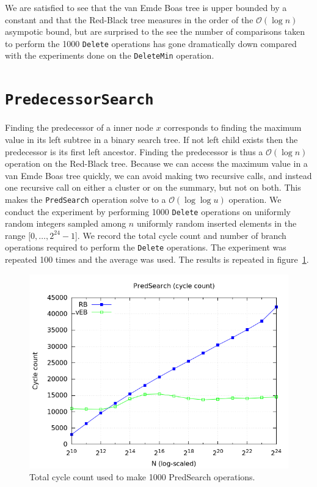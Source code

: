 \documentclass[a4paper,oneside,article,11pt]{memoir}
\begin{document}
We are satisfied to see that the van Emde Boas tree is upper bounded by a constant and that the Red-Black tree measures in the order of the $\mathcal{O}(\log n)$ asympotic bound, but are surprised to the see the number of comparisons taken to perform the 1000 \texttt{Delete} operations has gone dramatically down compared with the experiments done on the \texttt{DeleteMin} operation.

\section{\texttt{PredecessorSearch}}
Finding the predecessor of a inner node $x$ corresponds to finding the maximum value in its left subtree in a binary search tree. If not left child exists then the predecessor is its first left ancestor. Finding the predecessor is thus a $\mathcal{O}(\log n)$ operation on the Red-Black tree. Because we can access the maximum value in a van Emde Boas tree quickly, we can avoid making two recursive calls, and instead one recursive call on either a cluster or on the summary, but not on both. This makes the \texttt{PredSearch} operation solve to a $\mathcal{O}(\log \log u)$ operation.
We conduct the experiment by performing 1000 \texttt{Delete} operations on uniformly random integers sampled among $n$ uniformly random inserted elements in the range $[0, \dots, 2^{24}-1$]. We record the total cycle count and number of branch operations required to perform the \texttt{Delete} operations. The experiment was repeated 100 times and the average was used. The results is repeated in figure~\ref{fig:rbveb_pred_cyc}.

\begin{figure}[H]
\includegraphics[scale=0.5]{../res/rbveb/rbveb_pred_cyc.png}
\caption{Total cycle count used to make 1000 PredSearch operations.}
\label{fig:rbveb_pred_cyc}
\end{figure}
\end{document}
